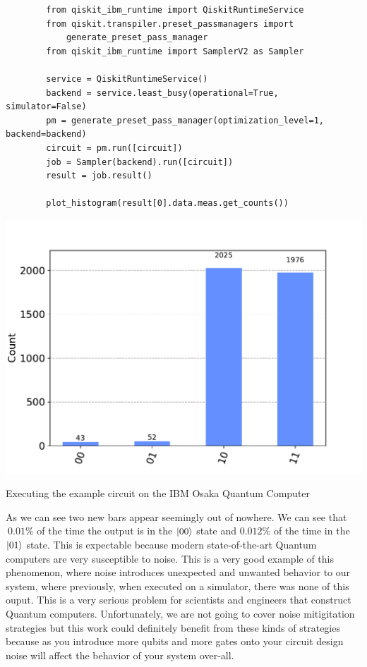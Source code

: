 \begin{listing}[ht]
    \centering
    \begin{verbatim}
        from qiskit_ibm_runtime import QiskitRuntimeService
        from qiskit.transpiler.preset_passmanagers import
            generate_preset_pass_manager
        from qiskit_ibm_runtime import SamplerV2 as Sampler

        service = QiskitRuntimeService()
        backend = service.least_busy(operational=True, simulator=False)
        pm = generate_preset_pass_manager(optimization_level=1, backend=backend)
        circuit = pm.run([circuit])
        job = Sampler(backend).run([circuit])
        result = job.result()

        plot_histogram(result[0].data.meas.get_counts())
    \end{verbatim}
    \centering
    \includegraphics[scale=0.45]{images/4_Qiskit/example_circuit_counts_ibm_osaka.pdf}
    \caption{Executing the example circuit on the IBM Osaka Quantum Computer}
\end{listing}

As we can see two new bars appear seemingly out of nowhere. We can see that
$~0.01\%$ of the time the output is in the $\ket{00}$ state and $0.012\%$
of the time in the $\ket{01}$ state. This is expectable because modern state-of-the-art
Quantum computers are very susceptible to noise. This is a very good example of
this phenomenon, where noise introduces unexpected and unwanted behavior to our
system, where previously, when executed on a simulator, there was none of this
ouput. This is a very serious problem for scientists and engineers that
construct Quantum computers. Unfortunately, we are not going to cover noise
mitigitation strategies but this work could definitely benefit
from these kinds of strategies because as you introduce more qubits and more
gates onto your circuit design noise will affect the behavior of your system
over-all.